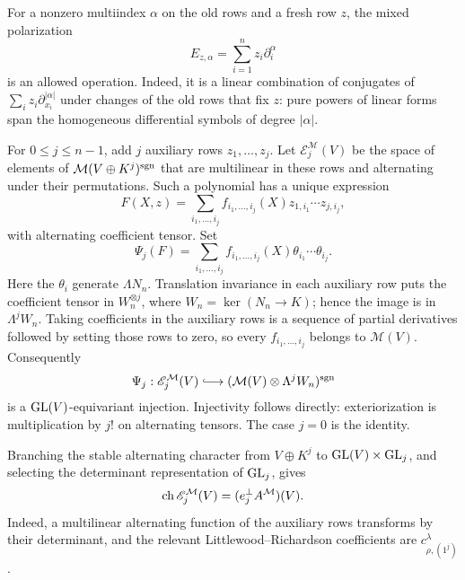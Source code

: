 For a nonzero multiindex $\alpha$ on the old rows and a fresh row $z$,
the mixed polarization
\begin{equation}\label{eq:r2-mixed-polarization}
 E_{z,\alpha}=\sum_{i=1}^n z_i\partial_i^\alpha
\end{equation}
is an allowed operation.  Indeed, it is a linear combination of
conjugates of $\sum_i z_i\partial_{x_i}^{|\alpha|}$ under changes of
the old rows that fix $z$: pure powers of linear forms span the
homogeneous differential symbols of degree $|\alpha|$.

For $0\leq j\leq n-1$, add $j$ auxiliary rows $z_1,\ldots,z_j$.
Let $\mathscr E_j^{\mathcal M}(V)$ be the space of elements of
$\mathcal M(V\oplus K^j)^{\operatorname{sgn}}$ that are multilinear in these rows
and alternating under their permutations.  Such a polynomial has a
unique expression
\[
 F(X,z)=\sum_{i_1,\ldots,i_j}
       f_{i_1,\ldots,i_j}(X)z_{1,i_1}\cdots z_{j,i_j},
\]
with alternating coefficient tensor.  Set
\begin{equation}\label{eq:r2-exteriorization-map}
 \Psi_j(F)=\sum_{i_1,\ldots,i_j}
           f_{i_1,\ldots,i_j}(X)
                 \theta_{i_1}\cdots\theta_{i_j}.
\end{equation}
Here the $\theta_i$ generate $\Lambda N_n$.  Translation invariance in
each auxiliary row puts the coefficient tensor in $W_n^{\otimes j}$,
where $W_n=\ker(N_n\to K)$; hence the image is in $\Lambda^jW_n$.
Taking coefficients in the auxiliary rows is a sequence of partial
derivatives followed by setting those rows to zero, so every
$f_{i_1,\ldots,i_j}$ belongs to $\mathcal M(V)$.
Consequently
\begin{equation}\label{eq:r2-exteriorization-injection}
 \Psi_j:\mathscr E_j^{\mathcal M}(V)
       \lhook\joinrel\longrightarrow
          (\mathcal M(V)\otimes\Lambda^jW_n)^{\sgn}
\end{equation}
is a $\operatorname{GL}(V)$-equivariant injection.  Injectivity follows directly:
exteriorization is multiplication by $j!$ on alternating tensors.
The case $j=0$ is the identity.

Branching the stable alternating character from $V\oplus K^j$ to
$\operatorname{GL}(V)\times\operatorname{GL}_j$, and selecting the determinant representation of
$\operatorname{GL}_j$, gives
\begin{equation}\label{eq:r2-exteriorization-character}
 \operatorname{ch}\mathscr E_j^{\mathcal M}(V)
          =(e_j^\perp A^{\mathcal M})(V).
\end{equation}
Indeed, a multilinear alternating function of the auxiliary rows
transforms by their determinant, and the relevant
Littlewood--Richardson coefficients are
$c_{\rho,(1^j)}^\lambda$.

